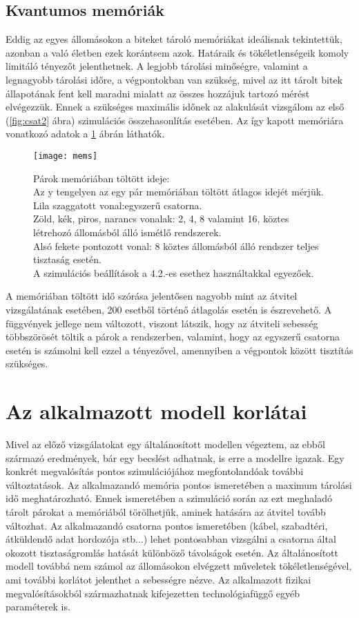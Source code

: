 \subsection{Kvantumos memóriák}
Eddig az egyes állomásokon a biteket tároló memóriákat ideálisnak tekintettük, azonban a való életben ezek korántsem azok. Határaik és tökéletlenségeik komoly limitáló tényezőt jelenthetnek. A legjobb tárolási minőségre, valamint a legnagyobb tárolási időre, a végpontokban van szükség, mivel az itt tárolt bitek állapotának fent kell maradni mialatt az összes hozzájuk tartozó mérést elvégezzük. Ennek a szükséges maximális időnek az alakulását vizsgálom az első (\ref{fig:csat2} ábra) szimulációs összehasonlítás esetében. Az így kapott memóriára vonatkozó adatok a \ref{fig:mem} ábrán láthatók.
\begin{figure}[H]
\centering
\texttt{[image: mems]}
\caption[Párok memóriában töltött ideje]
{Párok memóriában töltött ideje:\\
Az y tengelyen az egy pár memóriában töltött átlagos idejét mérjük.\\
Lila szaggatott vonal:egyszerű csatorna.\\
Zöld, kék, piros, narancs vonalak: 2, 4, 8 valamint 16, köztes létrehozó állomásból álló ismétlő rendszerek.\\
Alsó fekete pontozott vonal: 8 köztes állomásból álló rendszer teljes tisztaság esetén.\\
A szimulációs beállítások a 4.2.-es esethez használtakkal egyezőek.
}
\label{fig:mem}
\end{figure}
A memóriában töltött idő szórása jelentősen nagyobb mint az átvitel vizsgálatának esetében, 200 esetből történő átlagolás esetén is észrevehető. A függvények jellege nem változott, viszont látszik, hogy az átviteli sebesség többszörösét töltik a párok a rendszerben, valamint, hogy az egyszerű csatorna esetén is számolni kell ezzel a tényezővel, amennyiben a végpontok között tisztítás szükséges.


\section{Az alkalmazott modell korlátai}
Mivel az előző vizsgálatokat egy általánosított modellen végeztem, az ebből származó eredmények, bár egy becslést adhatnak,  is erre a modellre igazak. Egy konkrét megvalósítás pontos szimulációjához megfontolandóak további változtatások. Az alkalmazandó memória pontos ismeretében a maximum tárolási idő meghatározható. Ennek ismeretében a szimuláció során az ezt meghaladó tárolt párokat a memóriából törölhetjük, aminek hatására az átvitel tovább változhat. Az alkalmazandó csatorna pontos ismeretében (kábel, szabadtéri, átküldendő adat hordozója stb...) lehet pontosabban vizsgálni a csatorna által okozott tisztaságromlás hatását különböző távolságok esetén. Az általánosított modell továbbá nem számol az állomásokon elvégzett műveletek tökéletlenségével, ami további korlátot jelenthet a sebességre nézve. Az alkalmazott fizikai megvalósításokból származhatnak kifejezetten technológiafüggő egyéb paraméterek is. 

